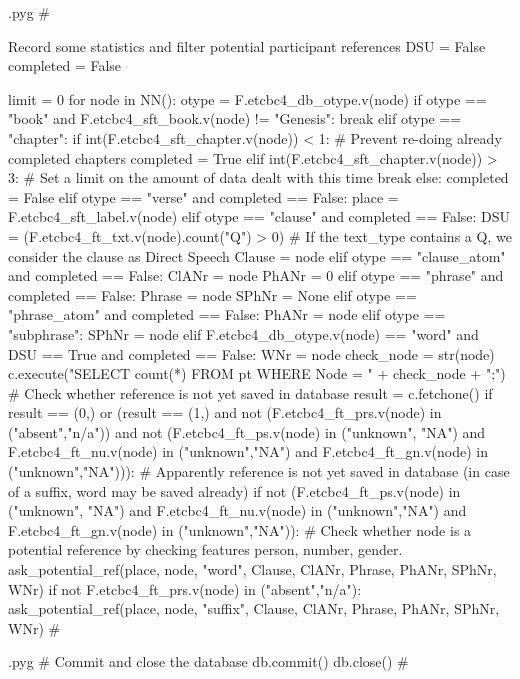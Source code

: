 \documentclass{report}
\makeatletter
\newenvironment{python}{%
  \VerbatimEnvironment
  \minted@resetoptions
  \setkeys{minted@opt}{}
      \begin{VerbatimOut}{\jobname.pyg}}
{%
      \end{VerbatimOut}
      \minted@pygmentize{python}
      \DeleteFile{\jobname.pyg}}
\makeatother
\begin{document}
\begin{python}
#{{{ Record some statistics and filter potential participant references
DSU = False
completed = False

limit = 0
for node in NN():
    otype = F.etcbc4_db_otype.v(node)
    if otype == "book" and F.etcbc4_sft_book.v(node) != "Genesis":
        break
    elif otype == "chapter":
        if int(F.etcbc4_sft_chapter.v(node)) < 1:    # Prevent re-doing already completed chapters
            completed = True
        elif int(F.etcbc4_sft_chapter.v(node)) > 3:    # Set a limit on the amount of data dealt with this time
            break
        else:
            completed = False
    elif otype == "verse" and completed == False:
        place = F.etcbc4_sft_label.v(node)
    elif otype == "clause" and completed == False:
        DSU = (F.etcbc4_ft_txt.v(node).count("Q") > 0)    # If the text_type contains a Q, we consider the clause as Direct Speech
        Clause = node
    elif otype == "clause_atom" and completed == False:
        ClANr = node
        PhANr = 0
    elif otype == "phrase" and completed == False:
        Phrase = node
        SPhNr = None
    elif otype == "phrase_atom" and completed == False:
        PhANr = node
    elif otype == "subphrase":
        SPhNr = node
    elif F.etcbc4_db_otype.v(node) == "word" and DSU == True and completed == False:
        WNr = node
        check_node = str(node)
        c.execute("SELECT count(*) FROM pt WHERE Node = " + check_node + ";") # Check whether reference is not yet saved in database
        result = c.fetchone()
        if result == (0,) or (result == (1,) and not (F.etcbc4_ft_prs.v(node) in ("absent","n/a")) and not (F.etcbc4_ft_ps.v(node) in ("unknown", "NA") and F.etcbc4_ft_nu.v(node) in ("unknown","NA") and F.etcbc4_ft_gn.v(node) in ("unknown","NA"))):    # Apparently reference is not yet saved in database (in case of a suffix, word may be saved already)
            if not (F.etcbc4_ft_ps.v(node) in ("unknown", "NA") and F.etcbc4_ft_nu.v(node) in ("unknown","NA") and F.etcbc4_ft_gn.v(node) in ("unknown","NA")):    # Check whether node is a potential reference by checking features person, number, gender.
                ask_potential_ref(place, node, "word", Clause, ClANr, Phrase, PhANr, SPhNr, WNr)
            if not F.etcbc4_ft_prs.v(node) in ("absent","n/a"):
                ask_potential_ref(place, node, "suffix", Clause, ClANr, Phrase, PhANr, SPhNr, WNr)
#}}}
\end{python}

\begin{python}
#{{{ Commit and close the database
db.commit()
db.close()
#}}}
\end{python}
\end{document}
